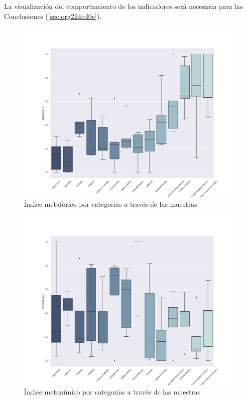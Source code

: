 \documentclass[12pt,letterpaper,twoside]{article}
\begin{document}
La visualización del comportamiento de los indicadores será necesaria para las Conclusiones (\ref{sec:org224cd0e}).

\begin{figure}[H]
\centering
\includegraphics[width=0.9\linewidth]{./resultados/graphs/total/accum_cat_metafora.png}
\caption{\label{fig:metafora_categorias} Índice metafórico por categorías a través de las muestras }
\end{figure}
\begin{figure}[H]
\centering
\includegraphics[width=0.9\linewidth]{./resultados/graphs/total/accum_cat_metonimia.png}
\caption{\label{fig:metonimia_categorias} Índice metonímico por categorías a través de las muestras  }
\end{figure}
\end{document}
